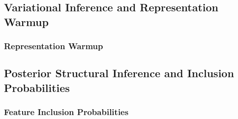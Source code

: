 \documentclass{article}
\begin{document}

\subsection{Variational Inference and Representation Warmup}
\label{sec:vi}

%
%
%
%
%
%


\subsubsection{Representation Warmup}
\label{sec:warmup}

%
%
%
%
%
%



\subsection{Posterior Structural Inference and Inclusion Probabilities}
\label{sec:pip}

%
%
%
%
%
%


\subsubsection{Feature Inclusion Probabilities}

%
\end{document}
